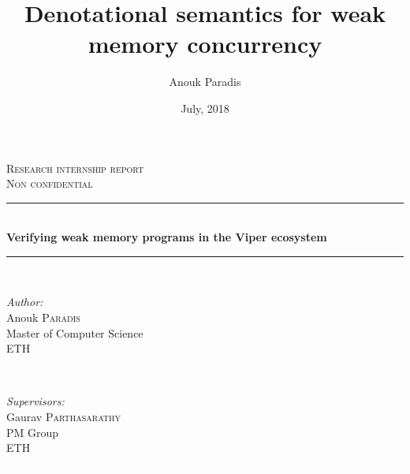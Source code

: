 \documentclass[titlepage,11pt,a4paper]{report}
\title{Denotational semantics for weak memory concurrency}
\author{Anouk Paradis}
\date{July, 2018}
\theoremstyle{plain}
\begin{document}
\begin{titlepage}

\newcommand{\HRule}{\rule{\linewidth}{0.5mm}} %

\center %
 

\textsc{\Large Research internship report}\\[0.5cm] %
\textsc{\Large Non confidential}\\[0.5cm] %


\HRule \\[0.4cm]
{ \huge \bfseries Verifying weak memory programs in the Viper ecosystem}\\[0.4cm] %
\HRule \\[1.5cm]


 

\begin{minipage}{0.4\textwidth}
\begin{flushleft} \large
\emph{Author:}\\
Anouk \textsc{Paradis} \\%
\small
Master of Computer Science\\
ETH
\end{flushleft}
\end{minipage}
~
\begin{minipage}{0.4\textwidth}
\begin{flushright} \large
\emph{Supervisors:} \\
Gaurav \textsc{Parthasarathy}\\ %
\small
PM Group\\
ETH\\
\textcolor{white}{lala}\\


\end{flushright}
\end{minipage}
\end{titlepage}
\end{document}
